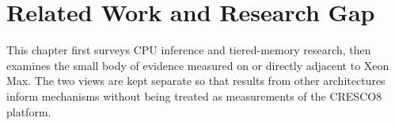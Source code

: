 \chapter{Related Work and Research Gap}
\label{chap:related-work}

This chapter first surveys CPU inference and tiered-memory research, then
examines the small body of evidence measured on or directly adjacent to
Xeon Max.  The two views are kept separate so that results from other
architectures inform mechanisms without being treated as measurements of
the CRESCO8 platform.




\cleardoublepage
